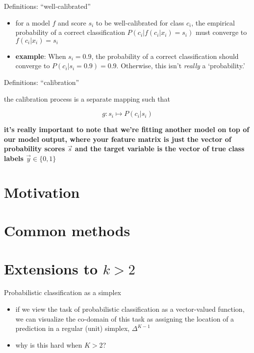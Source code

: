 \documentclass[ignorenonframetext,]{beamer}
\providecommand{\tightlist}{%
\setlength{\itemsep}{0pt}\setlength{\parskip}{0pt}}
\begin{document}
\begin{frame}{Definitions: ``well-calibrated''}

\begin{itemize}
\tightlist
\item
  for a model \(f\) and score \(s_i\) to be well-calibrated for class
  \(c_i\), the empirical probability of a correct classification
  \(P(c_i | f( c_i | x_i)=s_i)\) must converge to \(f(c_i | x_i) = s_i\)
  \vspace{5mm}
\item
  \textbf{example}: When \(s_i = 0.9\), the probability of a correct
  classification should converge to \(P(c_i | s_i = 0.9) = 0.9\).
  Otherwise, this isn't \textit{really} a `probability.'
\end{itemize}

\end{frame}

\begin{frame}{Definitions: ``calibration''}

the calibration process is a separate mapping such that

\[g: s_i \mapsto P(c_i | s_i)\]

\textbf{it's really important to note that we're fitting another model
on top of our model output, where your feature matrix is just the vector
of probability scores \(\vec{s}\) and the target variable is the vector
of true class labels \(\vec{y} \in \{0,1\}\)}

\end{frame}

\section{Motivation}\label{motivation}

\section{Common methods}\label{common-methods}

\section{\texorpdfstring{Extensions to
\(k > 2\)}{Extensions to k \textgreater{} 2}}\label{extensions-to-k-2}

\begin{frame}{Probabilistic classification as a simplex}

\begin{itemize}
\tightlist
\item
  if we view the task of probabilistic classification as a vector-valued
  function, we can visualize the co-domain of this task as assigning the
  location of a prediction in a regular (unit) simplex, \(\Delta^{K-1}\)
  \vspace{2mm}
\item
  why is this hard when \(K > 2\)?
\end{itemize}

\end{frame}
\end{document}
